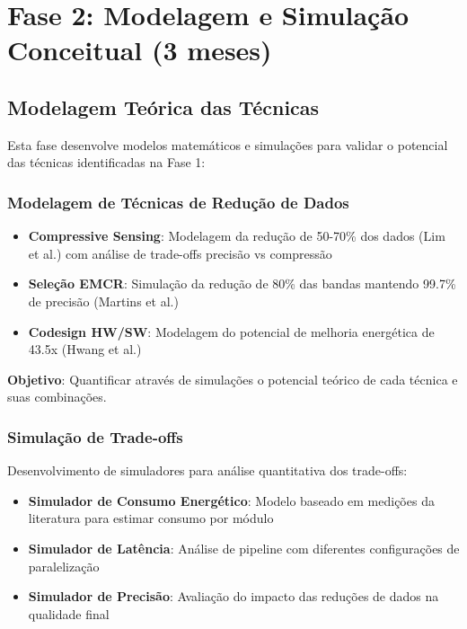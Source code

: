\section{Fase 2: Modelagem e Simulação Conceitual (3 meses)}

\subsection{Modelagem Teórica das Técnicas}

Esta fase desenvolve modelos matemáticos e simulações para validar o potencial das técnicas identificadas na Fase 1:

\subsubsection{Modelagem de Técnicas de Redução de Dados}

\begin{itemize}
\item \textbf{Compressive Sensing}: Modelagem da redução de 50-70\% dos dados (Lim et al.) com análise de trade-offs precisão vs compressão
\item \textbf{Seleção EMCR}: Simulação da redução de 80\% das bandas mantendo 99.7\% de precisão (Martins et al.)
\item \textbf{Codesign HW/SW}: Modelagem do potencial de melhoria energética de 43.5x (Hwang et al.)
\end{itemize}

\textbf{Objetivo}: Quantificar através de simulações o potencial teórico de cada técnica e suas combinações.

\subsubsection{Simulação de Trade-offs}

Desenvolvimento de simuladores para análise quantitativa dos trade-offs:

\begin{itemize}
\item \textbf{Simulador de Consumo Energético}: Modelo baseado em medições da literatura para estimar consumo por módulo
\item \textbf{Simulador de Latência}: Análise de pipeline com diferentes configurações de paralelização
\item \textbf{Simulador de Precisão}: Avaliação do impacto das reduções de dados na qualidade final
\end{itemize}

